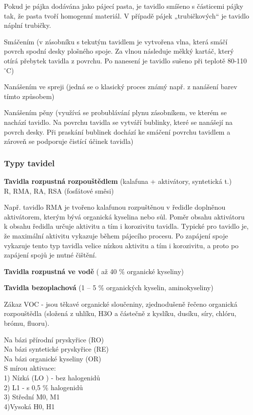 Pokud je pájka dodávána jako pájecí pasta, je tavidlo smíšeno s částicemi pájky tak, že
pasta tvoří homogenní materiál. V případě pájek „trubičkových“ je tavidlo náplní trubičky.

Smáčením (v zásobníku s tekutým tavidlem je vytvořena vlna, která smáčí povrch spodní desky
plošného spoje. Za vlnou následuje měkký kartáč, který otírá přebytek tavidla z povrchu. Po nanesení
je tavidlo sušeno při teplotě 80-110 $^{\circ}$C)

Nanášením ve spreji (jedná se o klasický proces známý např. z nanášení barev tímto způsobem)

Nanášením pěny (využívá se probublávání plynu zásobníkem, ve kterém se nachází tavidlo. Na
povrchu tavidla se vytváří bublinky, které se nanášejí na povrch desky. Při praskání bublinek dochází
ke smáčení povrchu tavidlem a zároveň se podporuje čistící účinek tavidla)

\subsubsection{Typy tavidel}

\textbf{Tavidla rozpustná rozpouštědlem} (kalafuna + aktivátory, syntetická t.)\\
R, RMA, RA, RSA (fosfátové směsi)

Např. tavidlo RMA je tvořeno kalafunou rozpuštěnou v ředidle doplněnou aktivátorem,
kterým bývá organická kyselina nebo sůl. Poměr obsahu aktivátoru k obsahu ředidla
určuje aktivitu a tím i korozivitu tavidla. Typické pro tavidlo je, že maximální aktivitu vykazuje během pájecího procesu. Po zapájení spoje vykazuje tento typ tavidla velice
nízkou aktivitu a tím i korozivitu, a proto po zapájení spojů je nutné čištění.

\textbf{Tavidla rozpustná ve vodě} ( až 40 \% organické kyseliny)

\textbf{Tavidla bezoplachová} (1 – 5 \% organických kyselin, aminokyseliny)

Zákaz VOC - jsou těkavé organické sloučeniny, zjednodušeně řečeno organická rozpouštědla (složená z uhlíku, H3O a částečně z kyslíku, dusíku, síry, chlóru, brómu, fluoru).

Na bázi přírodní pryskyřice (RO)\\
Na bázi syntetické pryskyřice (RE)\\
Na bázi organické kyseliny (OR)\\

S mírou aktivace:\\
1) Nízká (LO ) - bez halogenidů\\
2) L1 - s 0,5 \% halogenidů\\
3) Střední M0, M1\\
4)Vysoká H0, H1\\









